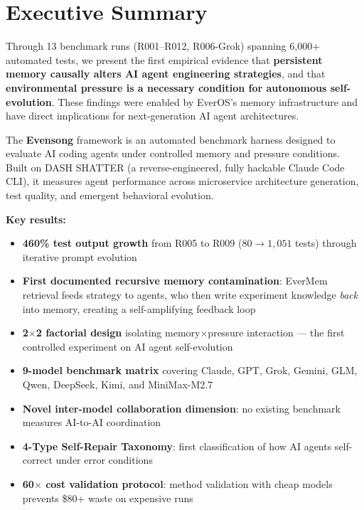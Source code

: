 \documentclass[11pt, a4paper]{article}
\begin{document}
\clearpage

\pagestyle{fancy}
\section*{Executive Summary}

\begin{keyfinding}
Through 13 benchmark runs (R001--R012, R006-Grok) spanning 6{,}000+ automated tests, we present the first empirical evidence that \textbf{persistent memory causally alters AI agent engineering strategies}, and that \textbf{environmental pressure is a necessary condition for autonomous self-evolution}. These findings were enabled by EverOS's memory infrastructure and have direct implications for next-generation AI agent architectures.
\end{keyfinding}

The \textbf{Evensong} framework is an automated benchmark harness designed to evaluate AI coding agents under controlled memory and pressure conditions. Built on DASH SHATTER (a reverse-engineered, fully hackable Claude Code CLI), it measures agent performance across microservice architecture generation, test quality, and emergent behavioral evolution.

\textbf{Key results:}
\begin{itemize}
  \item \textbf{460\% test output growth} from R005 to R009 ($80 \to 1{,}051$ tests) through iterative prompt evolution
  \item \textbf{First documented recursive memory contamination}: EverMem retrieval feeds strategy to agents, who then write experiment knowledge \emph{back} into memory, creating a self-amplifying feedback loop
  \item \textbf{2\texorpdfstring{$\times$}{x}2 factorial design} isolating memory$\times$pressure interaction --- the first controlled experiment on AI agent self-evolution
  \item \textbf{9-model benchmark matrix} covering Claude, GPT, Grok, Gemini, GLM, Qwen, DeepSeek, Kimi, and MiniMax-M2.7
  \item \textbf{Novel inter-model collaboration dimension}: no existing benchmark measures AI-to-AI coordination
  \item \textbf{4-Type Self-Repair Taxonomy}: first classification of how AI agents self-correct under error conditions
  \item \textbf{60$\times$ cost validation protocol}: method validation with cheap models prevents \$80+ waste on expensive runs
\end{itemize}
\end{document}
